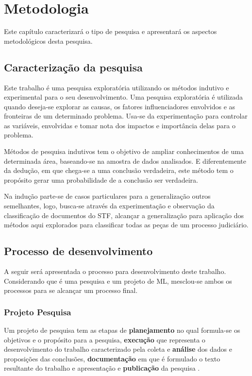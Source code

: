 \chapter[Metodologia]{Metodologia}
Este capítulo caracterizará o tipo de pesquisa e apresentará os aspectos metodológicos desta pesquisa.

\section{Caracterização da pesquisa}

Este trabalho é uma pesquisa exploratória utilizando os métodos indutivo e experimental para o seu desenvolvimento. Uma pesquisa exploratória é utilizada quando deseja-se explorar as causas, os fatores influenciadores envolvidos e as fronteiras de um determinado problema. Usa-se da experimentação para controlar as variáveis, envolvidas e tomar nota dos impactos e importância delas para o problema\cite{PRODANOV2013}.

Métodos de pesquisa indutivos tem o objetivo de ampliar conhecimentos de uma determinada área, baseando-se na amostra de dados analisados. E diferentemente da dedução, em que chega-se a uma conclusão verdadeira, este método tem o propósito gerar uma probabilidade de a conclusão ser verdadeira\cite{PRODANOV2013}.

Na indução parte-se de casos particulares para a generalização outros semelhantes\cite{PRODANOV2013},
logo, busca-se através da experimentação e observação da classificação de documentos do STF, alcançar a generalização para aplicação dos métodos aqui explorados para classificar todas as peças de um processo judiciário.


\section{Processo de desenvolvimento}

A seguir será apresentada o processo para desenvolvimento deste trabalho. Considerando que é uma pesquisa e um projeto de ML, mesclou-se ambos os processos para se alcançar um processo final.

\subsection{Projeto Pesquisa} \label{sec:projetoPesquisa}

Um projeto de pesquisa tem as etapas de \textbf{planejamento} no qual formula-se os objetivos e o propósito para a pesquisa, \textbf{execução} que representa o desenvolvimento do trabalho caracterizado pela coleta e \textbf{análise} dos dados e proposições das conclusões, \textbf{documentação} em que é formulado o texto resultante do trabalho e apresentação e \textbf{publicação} da pesquisa \cite{PRODANOV2013}.

